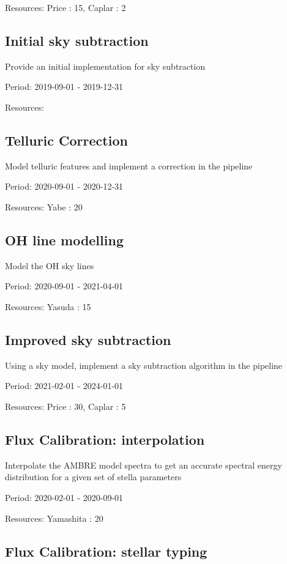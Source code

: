 Resources: Price : 15, Caplar : 2

\subsection{Initial sky subtraction}

Provide an initial implementation for sky subtraction

Period: 2019-09-01 - 2019-12-31

Resources: 

\subsection{Telluric Correction}

Model telluric features and implement a correction in the pipeline

Period: 2020-09-01 - 2020-12-31

Resources: Yabe : 20

\subsection{OH line modelling}

Model the OH sky lines

Period: 2020-09-01 - 2021-04-01

Resources: Yasuda : 15

\subsection{Improved sky subtraction}

Using a sky model, implement a sky subtraction algorithm in the pipeline

Period: 2021-02-01 - 2024-01-01

Resources: Price : 30, Caplar : 5

\subsection{Flux Calibration: interpolation}

Interpolate the AMBRE model spectra to get an accurate spectral energy distribution for a given set of stella parameters

Period: 2020-02-01 - 2020-09-01

Resources: Yamashita : 20

\subsection{Flux Calibration: stellar typing}

